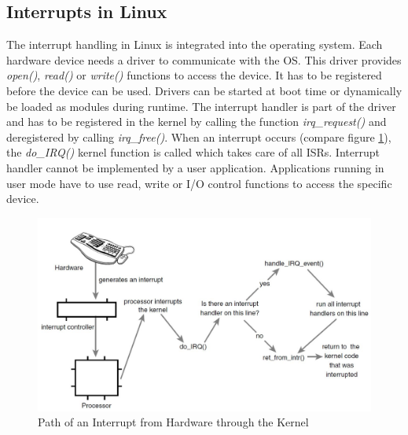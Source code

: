 \subsection{Interrupts in Linux}\label{ss_interrupts_in_linux}
The interrupt handling in Linux is integrated into the operating system.
Each hardware device needs a driver to communicate with the \ac{OS}.
This driver provides \textit{open()}, \textit{read()} or \textit{write()} functions to access the device. 
It has to be registered before the device can be used.
Drivers can be started at boot time or dynamically be loaded as modules during runtime.
The interrupt handler is part of the driver and has to be registered in the kernel by calling the function \textit{irq\_request()} and deregistered by calling \textit{irq\_free()}.
When an interrupt occurs (compare figure \ref{fig_irq_path_linux}), the \textit{do\_IRQ()} kernel function is called which takes care of all \acp{ISR}. 
Interrupt handler cannot be implemented by a user application.
Applications running in user mode have to use read, write or \ac{I/O} control functions to access the specific device.
\begin{figure}[htb]
	\begin{center}
		\includegraphics[scale=0.3]{inputs/pictures_ch1/irq_path_linux}
	\end{center}
	\caption[Path of an Interrupt from Hardware through the Kernel]{Path of an Interrupt from Hardware through the Kernel \cite{love:lkd}} \label{fig_irq_path_linux}
\end{figure}

